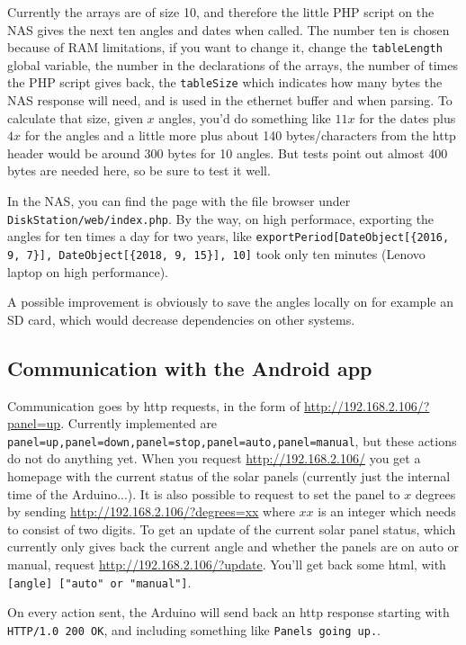 \documentclass{article}
\begin{document}
			Currently the arrays are of size 10, and therefore the little PHP script on the NAS gives the next ten angles and dates when called. The number ten is chosen because of RAM limitations, if you want to change it, change the \verb|tableLength| global variable, the number in the declarations of the arrays, the number of times the PHP script gives back, the \verb|tableSize| which indicates how many bytes the NAS response will need, and is used in the ethernet buffer and when parsing. To calculate that size, given $x$ angles, you'd do something like $11x$ for the dates plus $4x$ for the angles and a little more plus about 140 bytes/characters from the http header would be around 300 bytes for 10 angles. But tests point out almost 400 bytes are needed here, so be sure to test it well. 
			
			In the NAS, you can find the page with the file browser under \verb|DiskStation/web/index.php|.
			By the way, on high performace, exporting the angles for ten times a day for two years, like \verb|exportPeriod[DateObject[{2016, 9, 7}], DateObject[{2018, 9, 15}], 10]| took only ten minutes (Lenovo laptop on high performance).
			
			A possible improvement is obviously to save the angles locally on for example an SD card, which would decrease dependencies on other systems.
			
		\subsection{Communication with the Android app} \label{arduinoToAndroid}
			Communication goes by http requests, in the form of \url{http://192.168.2.106/?panel=up}. Currently implemented are \verb|panel=up,panel=down,panel=stop,panel=auto,panel=manual|, but these actions do not do anything yet. When you request \url{http://192.168.2.106/} you get a homepage with the current status of the solar panels (currently just the internal time of the Arduino...). It is also possible to request to set the panel to $x$ degrees by sending \url{http://192.168.2.106/?degrees=xx} where $xx$ is an integer which needs to consist of two digits. To get an update of the current solar panel status, which currently only gives back the current angle and whether the panels are on auto or manual, request \url{http://192.168.2.106/?update}. You'll get back some html, with \verb|[angle] ["auto" or "manual"]|.
			
			On every action sent, the Arduino will send back an http response starting with \verb|HTTP/1.0 200 OK|, and including something like \verb|Panels going up.|.
			
\end{document}
